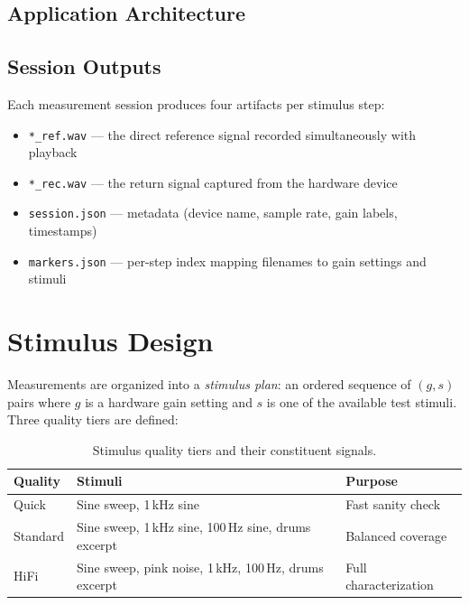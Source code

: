 \documentclass[11pt, letterpaper]{article}
\begin{document}
\subsection{Application Architecture}

\subsection{Session Outputs}
Each measurement session produces four artifacts per stimulus step:
\begin{itemize}
    \item \texttt{*\_ref.wav} — the direct reference signal recorded simultaneously with playback
    \item \texttt{*\_rec.wav} — the return signal captured from the hardware device
    \item \texttt{session.json} — metadata (device name, sample rate, gain labels, timestamps)
    \item \texttt{markers.json} — per-step index mapping filenames to gain settings and stimuli
\end{itemize}

\section{Stimulus Design}
\label{sec:stimulus}

Measurements are organized into a \emph{stimulus plan}: an ordered sequence of
$(g, s)$ pairs where $g$ is a hardware gain setting and $s$ is one of the
available test stimuli.  Three quality tiers are defined:

\begin{table}[H]
    \centering
    \begin{tabular}{lll}
        \toprule
        \textbf{Quality} & \textbf{Stimuli} & \textbf{Purpose} \\
        \midrule
        Quick    & Sine sweep, 1\,kHz sine                                      & Fast sanity check \\
        Standard & Sine sweep, 1\,kHz sine, 100\,Hz sine, drums excerpt         & Balanced coverage \\
        HiFi     & Sine sweep, pink noise, 1\,kHz, 100\,Hz, drums excerpt       & Full characterization \\
        \bottomrule
    \end{tabular}
    \caption{Stimulus quality tiers and their constituent signals.}
    \label{tab:quality}
\end{table}
\end{document}
